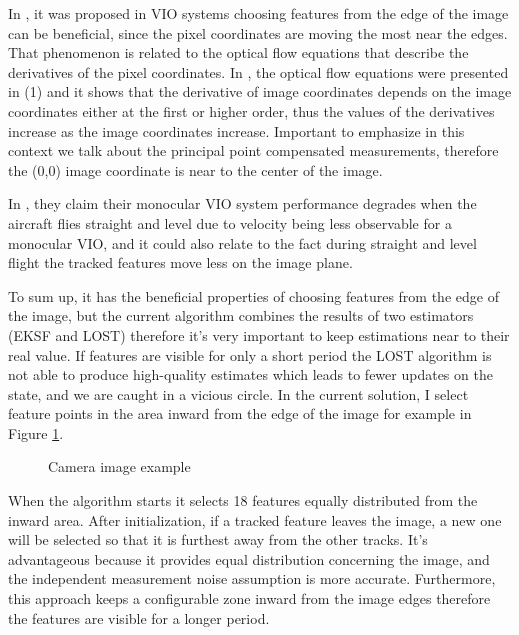 In \cite{image-based-INS}, it was proposed in VIO systems choosing features from the edge of the image can be beneficial, since the pixel coordinates are moving the most near the edges. That phenomenon is related to the optical flow equations that describe the derivatives of the pixel coordinates. In \cite{optic-flow}, the optical flow equations were presented in (1) and it shows that the derivative of image coordinates depends on the image coordinates either at the first or higher order, thus the values of the derivatives increase as the image coordinates increase. Important to emphasize in this context we talk about the principal point compensated measurements, therefore the (0,0) image coordinate is near to the center of the image.

In \cite{rel-nav}, they claim their monocular VIO system performance degrades when the aircraft flies straight and level due to velocity being less observable for a monocular VIO, and it could also relate to the fact during straight and level flight the tracked features move less on the image plane.

To sum up, it has the beneficial properties of choosing features from the edge of the image, but the current algorithm combines the results of two estimators (EKSF and LOST) therefore it's very important to keep estimations near to their real value. If features are visible for only a short period the LOST algorithm is not able to produce high-quality estimates which leads to fewer updates on the state, and we are caught in a vicious circle. In the current solution, I select feature points in the area inward from the edge of the image for example in Figure \ref{fig:camera-image}.

\begin{figure}[!ht]
    \centering
    
    \caption{Camera image example}
    \label{fig:camera-image}
\end{figure}

When the algorithm starts it selects 18 features equally distributed from the inward area. After initialization, if a tracked feature leaves the image, a new one will be selected so that it is furthest away from the other tracks. It's advantageous because it provides equal distribution concerning the image, and the independent measurement noise assumption is more accurate. Furthermore, this approach keeps a configurable zone inward from the image edges therefore the features are visible for a longer period.

